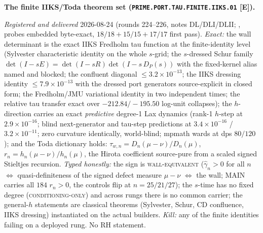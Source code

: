 \documentclass[11pt,a4paper]{article}
\begin{document}
\par\smallskip\noindent\textbf{The finite IIKS/Toda theorem set
(\texttt{PRIME.PORT.TAU.FINITE.\allowbreak IIKS.01} [E]).}
{\sloppy
\emph{Registered and delivered} 2026-08-24 (rounds 224--226,
notes DL/DLI/DLII;
, probes embedded
byte-exact, $18/18 + 15/15 + 17/17$ first pass).  \emph{Exact:}
the wall determinant is the exact IIKS Fredholm tau function at
the finite-identity level (Sylvester characteristic identity on
the whole $s$-grid; the $s$-dressed Schur family $\det(I - sE) =
\det(I - sR)\det(I - s\,D_P(s))$ with the fixed-kernel alias
named and blocked; the confluent diagonal $\le
3.2\times10^{-13}$; the IIKS dressing identity $\le
7.9\times10^{-13}$ with the dressed port generators
source-explicit in closed form; the Fredholm/JMU variational
identity in two independent times; the relative tau transfer
exact over $-212.84/-195.50$ log-unit collapses); the
$h$-direction carries an exact \emph{predictive} degree-1 Lax
dynamics (rank-1 $h$-step at $2.9\times10^{-16}$; blind
next-generator and tau-step predictions at $3.4\times10^{-16}$ /
$3.2\times10^{-11}$; zero curvature identically, world-blind;
mpmath wards at dps $80/120$); and the Toda dictionary holds:
$\tau_{w,n} = D_n(\mu - \nu)/D_n(\mu)$, $r_n = h_n(\mu -
\nu)/h_n(\mu)$, the Hirota coefficient source-pure from a scaled
signed Stieltjes recursion.  \emph{Typed honestly:} the sign is
\textsc{wall-equivalent} ($\hat\gamma_n > 0$ for all $n$ $\iff$
quasi-definiteness of the signed defect measure $\mu - \nu$
$\iff$ the wall; MAIN carries all $184$ $r_n > 0$, the controls
flip at $n = 25/21/27$); the $s$-time has no fixed degree
(\textsc{conditioning-only}) and across rungs there is no common
carrier; the general-$h$ statements are classical theorems
(Sylvester, Schur, CD confluence, IIKS dressing) instantiated on
the actual builders.  \emph{Kill:} any of the finite identities
failing on a deployed rung.  No RH statement.\par}
\end{document}
